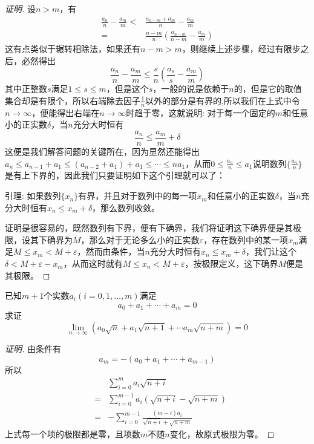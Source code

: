 \begin{proof}[证明]
设$n>m$，有
\begin{align*}
\frac{a_n}{n} - \frac{a_m}{m} < & \frac{a_{n-m}+a_m}{n} - \frac{a_m}{m} \\
 = & \frac{n-m}{n} \left( \frac{a_{n-m}}{n-m} - \frac{a_m}{m} \right)
\end{align*}
这有点类似于辗转相除法，如果还有$n-m>m$，则继续上述步骤，经过有限步之后，必然得出
\[ \frac{a_n}{n} - \frac{a_m}{m} \leqslant \frac{s}{n} \left( \frac{a_s}{s} - \frac{a_m}{m} \right) \]
其中正整数$s$满足$1 \leqslant s \leqslant m$，但是这个$s$，一般的说是依赖于$n$的，但是它的取值集合却是有限个，所以右端除去因子$\frac{1}{n}$以外的部分是有界的,所以我们在上式中令$n \to \infty$，便能得出右端在$n \to \infty$时趋于零，这就说明: 对于每一个固定的$m$和任意小的正实数$\delta$，当$n$充分大时恒有
\[ \frac{a_n}{n} \leqslant \frac{a_m}{m} + \delta \]
这便是我们解答问题的关键所在，因为显然还能得出$a_n \leqslant a_{n-1}+a_1 \leqslant (a_{n-2}+a_1)+a_1 \leqslant \cdots \leqslant na_1$，从而$0 \leqslant \frac{a_n}{n} \leqslant a_1$说明数列$\{\frac{a_n}{n}\}$是有上下界的，因此我们只要证明如下这个引理就可以了：

引理: 如果数列$\{ x_n \}$有界，并且对于数列中的每一项$x_m$和任意小的正实数$\delta$，当$n$充分大时恒有$x_n \leqslant x_m+\delta$，那么数列收敛。

证明是很容易的，既然数列有下界，便有下确界，我们将证明这下确界便是其极限，设其下确界为$M$，那么对于无论多么小的正实数$\varepsilon$，存在数列中的某一项$x_m$满足$M \leqslant x_m  < M+\varepsilon$，然而由条件，当$n$充分大时恒有$x_n \leqslant x_m+\delta$，我们让这个$\delta<M+\varepsilon-x_m$，从而这时就有$M \leqslant x_n  < M+\varepsilon$，按极限定义，这下确界$M$便是其极限。
\end{proof}

\begin{exercise}
  已知$m+1$个实数$a_i(i=0,1,\ldots,m)$满足
  \[ a_0+a_1+\cdots+a_m=0 \]
  求证
  \[ \lim_{n \to \infty} (a_0 \sqrt{n}+a_1 \sqrt{n+1}+\cdots a_m \sqrt{n+m}) = 0 \]
\end{exercise}

\exerciseFrom[\url{http://kuing.orzweb.net/viewthread.php?tid=4640}]

\exerciseSolvedDate[2017-05-27]

\begin{proof}[证明]
  由条件有
  \[ a_m = -(a_0+a_1+\cdots+a_{m-1}) \]
  所以
  \begin{eqnarray*}
    && \sum_{i=0}^m a_i \sqrt{n+i}  \\
    & = & \sum_{i=0}^{m-1} a_i (\sqrt{n+i}-\sqrt{n+m}) \\
    & = & - \sum_{i=0}^{m-1} \frac{(m-i)a_i}{\sqrt{n+i}+\sqrt{n+m}}
  \end{eqnarray*}
  上式每一个项的极限都是零，且项数$m$不随$n$变化，故原式极限为零。
\end{proof}


